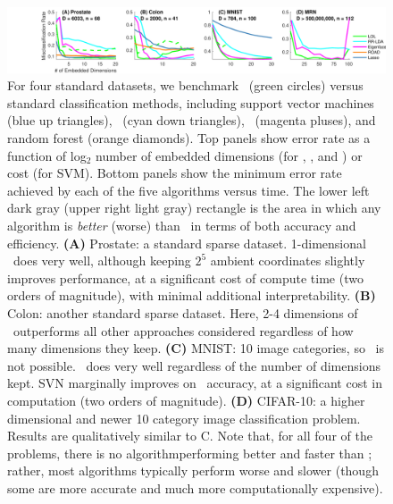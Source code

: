 \documentclass[10pt]{article}
\begin{document}
\begin{figure}[h!]
\centering
\includegraphics[width=1\linewidth]{../Figs/plot_real}
\caption{
For four standard datasets, we benchmark \Lol~(green circles) versus standard classification methods, including support vector machines (blue up triangles), \Road~(cyan down triangles), ~(magenta pluses), and random forest (orange diamonds).
Top panels show error rate as a function of log$_2$ number of embedded dimensions (for \Lol, \Road, and ) or cost (for SVM).
Bottom panels show the minimum error rate achieved by each of the five algorithms versus time.
The lower left dark gray (upper right light gray) rectangle is the area in which any algorithm is \emph{better}  (worse) than \Lol~in terms of both accuracy and efficiency.
\textbf{(A)} Prostate: a standard sparse dataset.  1-dimensional \Lol~does very well, although keeping $2^5$ ambient coordinates slightly improves performance, at a significant cost of compute time (two orders of magnitude), with minimal additional interpretability.
\textbf{(B)} Colon: another standard sparse dataset.  Here, 2-4 dimensions of \Lol~outperforms all other approaches considered regardless of how many dimensions they keep.
\textbf{(C)} MNIST: 10 image categories, so \Road~is not possible.  \Lol~does very well regardless of the number of dimensions kept.  SVN marginally improves on \Lol~accuracy, at a significant cost in computation (two orders of magnitude).
\textbf{(D)} CIFAR-10: a higher dimensional and newer 10 category image classification problem.  Results are qualitatively similar to C.
%
Note that, for all four of the problems, there is no algorithmperforming better and faster than \Lol; rather, most algorithms typically perform worse and slower (though some are more accurate and much more computationally expensive).
}
\label{f:realdata}
\end{figure}
\end{document}
